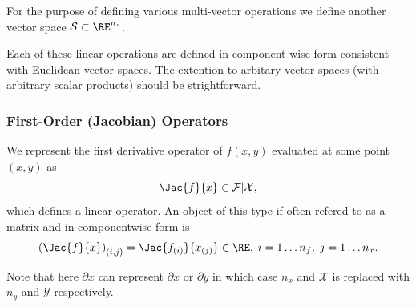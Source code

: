 \documentclass[pdf,ps2pdf,11pt]{SANDreport}
\begin{document}
For the purpose of defining various multi-vector operations we define another
vector space $\mathcal{S}\subset\RE^{n_s}$.

Each of these linear operations are defined in component-wise form consistent
with Euclidean vector spaces.  The extention to arbitary vector spaces (with
arbitrary scalar products) should be strightforward.

\subsubsection{First-Order (Jacobian) Operators}

We represent the first derivative operator of $f(x,y)$ evaluated at some point
$(x,y)$ as
%
\begin{equation}
\Jac{f}{x}\in\mathcal{F}|\mathcal{X},
\end{equation}
%
which defines a linear operator.  An object of this type if often refered to
as a matrix and in componentwise form is
%
\begin{equation}
\left(\Jac{f}{x}\right)_{(i,j)} = \Jac{f_{(i)}}{x_{(j)}} \in\RE, \; i = 1 \ldots n_f, \; j = 1 \ldots n_x.
\end{equation}

Note that here $\partial x$ can represent $\partial x$ or $\partial y$ in
which case $n_x$ and $\mathcal{X}$ is replaced with $n_y$ and $\mathcal{Y}$
respectively.
\end{document}
